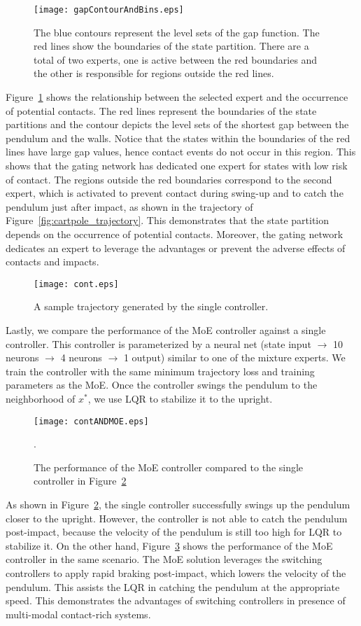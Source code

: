 \begin{figure}[tb]
    \centering
    \texttt{[image: gapContourAndBins.eps]}
    \caption{The blue contours represent the level sets of the gap function. The red lines show the boundaries of the state partition. There are a total of two experts, one is active between the red boundaries and the other is responsible for regions outside the red lines.}
    \label{fig:gapContour}
\end{figure}
Figure~\ref{fig:gapContour} shows the relationship between the selected expert
and the occurrence of potential contacts.
%
The red lines represent the boundaries of the state partitions and the contour
depicts the level sets of the shortest gap between the pendulum and the walls.
%
Notice that the states within the boundaries of the red lines have large gap
values, hence contact events do not occur in this region.
%
This shows that the gating network has dedicated one expert for states with low
risk of contact.
%
The regions outside the red boundaries correspond to the second expert, which is
activated to prevent contact during swing-up and to catch the pendulum just
after impact, as shown in the trajectory of
Figure~\ref{fig:cartpole_trajectory}.
%
This demonstrates that the state partition depends on the occurrence of
potential contacts.
%
Moreover, the gating network dedicates an expert to leverage the
advantages or prevent the adverse effects of contacts and impacts.
%

\begin{figure}[tb]
    \centering
    \texttt{[image: cont.eps]}
    \caption{A sample trajectory generated by the single controller. }
    \label{fig:continuous_control}
\end{figure}
%
Lastly, we compare the performance of the MoE controller against a single controller.
%
This controller is parameterized by a neural net (state input $\rightarrow$ 10
neurons $\rightarrow$ 4 neurons $\rightarrow$  1 output) similar to one of the
mixture experts.
%
We train the controller with the same minimum trajectory loss and training
parameters as the MoE.
%
Once the controller swings the pendulum to the neighborhood of $x^*$, we use LQR
to stabilize it to the upright.
%
%
\begin{figure}[tb]
    \centering
    \texttt{[image: contANDMOE.eps]}
    \caption{The performance of the MoE controller compared to the single
    controller in Figure~\ref{fig:continuous_control}}.
    \label{fig:contandmoe}
\end{figure}
%
\noindent As shown in Figure~\ref{fig:continuous_control}, the single controller
successfully swings up the pendulum closer to the upright.
%
However, the controller is not able to catch the pendulum post-impact, because
the velocity of the pendulum is still too high for LQR to stabilize it.
%
On the other hand, Figure~\ref{fig:contandmoe} shows the performance of the MoE
controller in the same scenario.
%
The MoE solution leverages the switching controllers to apply rapid braking
post-impact, which lowers the velocity of the pendulum. 
%
This assists the LQR in catching the pendulum at the appropriate speed.
%
This demonstrates the advantages of switching controllers in presence of
multi-modal contact-rich systems.